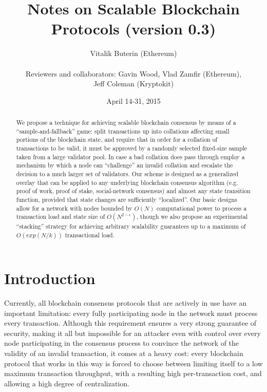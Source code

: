 \documentclass[11pt,a4paper]{article}
\makeatletter
\theoremstyle{plain}
\theoremstyle{definition}
\theoremstyle{remark}
\newcommand{\eg}{e.g.\@\xspace}
\makeatother
\begin{document}
\title{Notes on Scalable Blockchain Protocols (version 0.3)}
\date{April 14-31, 2015}
\author{Vitalik Buterin (Ethereum) \\  \\ Reviewers and collaborators: Gavin Wood, Vlad Zamfir (Ethereum), \\ Jeff Coleman (Kryptokit)}

\maketitle

\begin{abstract}
We propose a technique for achieving scalable blockchain consensus by means of a ``sample-and-fallback'' game: split transactions up into collations affecting small portions of the blockchain state, and require that in order for a collation of transactions to be valid, it must be approved by a randomly selected fixed-size sample taken from a large validator pool. In case a bad collation does pass through employ a mechanism by which a node can ``challenge'' an invalid collation and escalate the decision to a much larger set of validators. Our scheme is designed as a generalized overlay that can be applied to any underlying blockchain consensus algorithm (\eg proof of work, proof of stake, social-network consensus) and almost any state transition function, provided that state changes are sufficiently ``localized''. Our basic designs allow for a network with nodes bounded by $O(N)$ computational power to process a transaction load and state size of $O(N^{2-\epsilon})$, though we also propose an experimental ``stacking'' strategy for achieving arbitrary scalability guarantees up to a maximum of $O(exp(N/k))$ transactional load.
\end{abstract}

\section{Introduction}

Currently, all blockchain consensus protocols that are actively in use have an important limitation: every fully participating node in the network must process every transaction. Although this requirement ensures a very strong guarantee of security, making it all but impossible for an attacker even with control over every node participating in the consensus process to convince the network of the validity of an invalid transaction, it comes at a heavy cost: every blockchain protocol that works in this way is forced to choose between limiting itself to a low maximum transaction throughput, with a resulting high per-transaction cost, and allowing a high degree of centralization.
\end{document}
